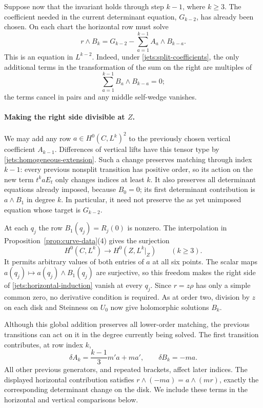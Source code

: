 Suppose now that the invariant holds through step $k-1$, where
$k\geq3$.  The coefficient needed in the current determinant equation,
$G_{k-2}$, has already been chosen.  On each chart the horizontal row
must solve
\begin{equation}\label{jets:horizontal-induction}
 r\wedge B_k=G_{k-2}
       -\sum_{a=1}^{k-1}A_a\wedge B_{k-a}.
\end{equation}
This is an equation in $L^{k-2}$.  Indeed, under
\eqref{jets:split-coefficients}, the only additional terms in the
transformation of the sum on the right are multiples of
\[
 \sum_{a=1}^{k-1}B_a\wedge B_{k-a}=0;
\]
the terms cancel in pairs and any middle self-wedge vanishes.

\paragraph{Making the right side divisible at $Z$.}
We may add any row $a\in H^0(C,L^k)^2$ to the previously chosen
vertical coefficient $A_{k-1}$.  Differences of vertical lifts have
this tensor type by \eqref{jets:homogeneous-extension}.
Such a change preserves matching through index $k-1$: every
previous nonsplit transition has positive order, so its action on the
new term $t^kaE_t$ only changes indices at least $k$.
It also preserves all determinant equations already imposed, because
$B_0=0$; its first determinant contribution is $a\wedge B_1$ in
degree $k$.  In particular, it need not preserve the as yet unimposed
equation whose target is $G_{k-2}$.

At each $q_j$ the row $B_1(q_j)=R_j(0)$ is nonzero.
The interpolation in Proposition~\ref{prop:curve-data}(4) gives the
surjection
\[
 H^0(C,L^k)\longrightarrow H^0(Z,L^k|_Z)\qquad(k\geq3).
\]
It permits arbitrary values of both entries of $a$ at all six points.
The scalar maps
$a(q_j)\mapsto a(q_j)\wedge B_1(q_j)$ are surjective, so this
freedom makes the right side of \eqref{jets:horizontal-induction}
vanish at every $q_j$.
Since $r=z\rho$ has only a simple common zero, no derivative
condition is required.  As at order two, division by $z$ on each
disk and Steinness on $U_0$ now give holomorphic solutions $B_k$.

Although this global addition preserves all lower-order matching,
the previous transitions can act on it in the degree currently being solved.
The first transition contributes, at row index $k$,
\begin{equation}\label{jets:old-transition-effect}
 \delta A_k=\frac{k-1}{3}m'a+ma',\qquad
 \delta B_k=-ma.
\end{equation}
All other previous generators, and repeated brackets, affect later
indices.  The displayed horizontal contribution satisfies
$r\wedge(-ma)=a\wedge(mr)$, exactly the corresponding determinant
change on the disk.  We include these terms in the horizontal and
vertical comparisons below.


